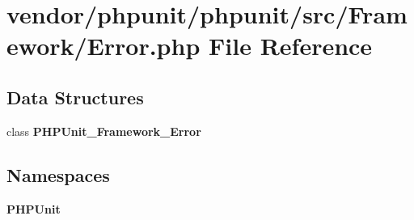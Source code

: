 \section{vendor/phpunit/phpunit/src/\+Framework/\+Error.php File Reference}
\label{phpunit_2phpunit_2src_2_framework_2_error_8php}
\subsection*{Data Structures}
\begin{DoxyCompactItemize}
\item 
class {\bf P\+H\+P\+Unit\+\_\+\+Framework\+\_\+\+Error}
\end{DoxyCompactItemize}
\subsection*{Namespaces}
\begin{DoxyCompactItemize}
\item 
 {\bf P\+H\+P\+Unit}
\end{DoxyCompactItemize}
